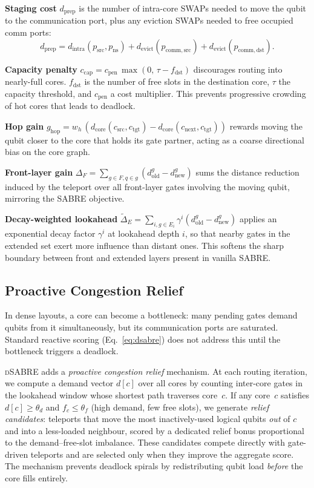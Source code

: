 \documentclass[conference]{IEEEtran}
\newcommand{\dSABRE}{\textsc{dSABRE}}
\newcommand{\SABRE}{\textsc{SABRE}}
\newcommand{\dcore}{d_{\mathrm{core}}}
\begin{document}
\textbf{Staging cost} $d_{\mathrm{prep}}$ is the number of intra-core SWAPs
needed to move the qubit to the communication port, plus any eviction SWAPs
needed to free occupied comm ports:
\[
  d_{\mathrm{prep}} = d_{\mathrm{intra}}(p_{\mathrm{src}}, p_{\mathrm{ns}})
                    + d_{\mathrm{evict}}(p_{\mathrm{comm,src}})
                    + d_{\mathrm{evict}}(p_{\mathrm{comm,dst}}).
\]

\textbf{Capacity penalty} $c_{\mathrm{cap}} = c_{\mathrm{pen}}\,\max(0,\,\tau - f_{\mathrm{dst}})$
discourages routing into nearly-full cores.
$f_{\mathrm{dst}}$ is the number of free slots in the destination core,
$\tau$ the capacity threshold, and $c_{\mathrm{pen}}$ a cost multiplier.
This prevents progressive crowding of hot cores that leads to deadlock.

\textbf{Hop gain} $g_{\mathrm{hop}} = w_h\,(\dcore(c_{\mathrm{src}},c_{\mathrm{tgt}}) - \dcore(c_{\mathrm{next}},c_{\mathrm{tgt}}))$
rewards moving the qubit closer to the core that holds its gate partner,
acting as a coarse directional bias on the core graph.

\textbf{Front-layer gain} $\Delta_F = \sum_{g \in F, q \in g} (d_{\mathrm{old}}^g - d_{\mathrm{new}}^g)$
sums the distance reduction induced by the teleport over all front-layer
gates involving the moving qubit, mirroring the \SABRE{} objective.

\textbf{Decay-weighted lookahead} $\tilde{\Delta}_E = \sum_{i,g \in E_i} \gamma^i (d_{\mathrm{old}}^g - d_{\mathrm{new}}^g)$
applies an exponential decay factor $\gamma^i$ at lookahead depth $i$, so
that nearby gates in the extended set exert more influence than distant ones.
This softens the sharp boundary between front and extended layers present in
vanilla \SABRE{}.

\subsection{Proactive Congestion Relief}
\label{sec:relief}

In dense layouts, a core can become a bottleneck: many pending gates demand
qubits from it simultaneously, but its communication ports are saturated.
Standard reactive scoring (Eq.~\ref{eq:dsabre}) does not address this until
the bottleneck triggers a deadlock.

\dSABRE{} adds a \emph{proactive congestion relief} mechanism.
At each routing iteration, we compute a demand vector $d[c]$ over all cores
by counting inter-core gates in the lookahead window whose shortest path
traverses core~$c$.
If any core~$c$ satisfies $d[c] \ge \theta_d$ and $f_c \le \theta_f$
(high demand, few free slots), we generate \emph{relief candidates}: teleports
that move the most inactively-used logical qubits \emph{out} of $c$ and into a
less-loaded neighbour, scored by a dedicated relief bonus proportional to the
demand--free-slot imbalance.
These candidates compete directly with gate-driven teleports and are selected
only when they improve the aggregate score.
The mechanism prevents deadlock spirals by redistributing qubit load
\emph{before} the core fills entirely.
\end{document}
